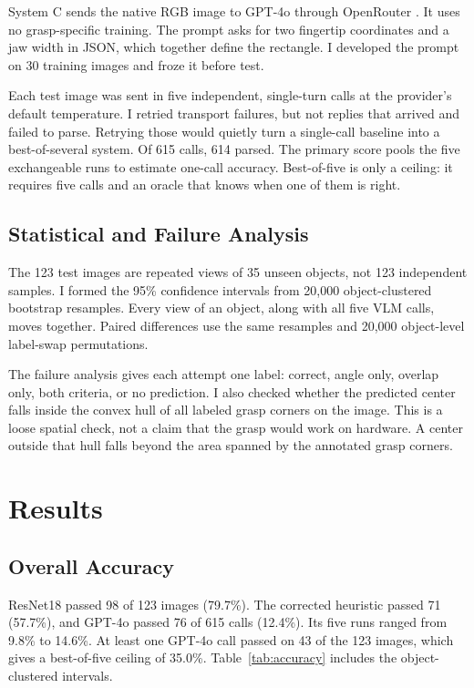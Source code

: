 \documentclass[10pt,conference,compsoc]{IEEEtran}
\begin{document}
System C sends the native RGB image to GPT-4o through OpenRouter
\cite{openai2024}. It uses no grasp-specific training. The prompt asks for two
fingertip coordinates and a jaw width in JSON, which together define the
rectangle. I developed the prompt on 30 training images and froze it before
test.

Each test image was sent in five independent, single-turn calls at the
provider's default temperature. I retried transport failures, but not replies
that arrived and failed to parse. Retrying those would quietly turn a
single-call baseline into a best-of-several system. Of 615 calls, 614 parsed.
The primary score pools the five exchangeable runs to estimate one-call
accuracy. Best-of-five is only a ceiling: it requires five calls and an oracle
that knows when one of them is right.

\subsection{Statistical and Failure Analysis}

The 123 test images are repeated views of 35 unseen objects, not 123
independent samples. I formed the 95\% confidence intervals from 20,000
object-clustered bootstrap resamples. Every view of an object, along with all
five VLM calls, moves together. Paired differences use the same resamples and
20,000 object-level label-swap permutations.

The failure analysis gives each attempt one label: correct, angle only,
overlap only, both criteria, or no prediction. I also checked whether the
predicted center falls inside the convex hull of all labeled grasp corners on
the image. This is a loose spatial check, not a claim that the grasp would
work on hardware. A center outside that hull falls beyond the area spanned by
the annotated grasp corners.

\section{Results}

\subsection{Overall Accuracy}

ResNet18 passed 98 of 123 images (79.7\%). The corrected heuristic passed 71
(57.7\%), and GPT-4o passed 76 of 615 calls (12.4\%). Its five runs ranged
from 9.8\% to 14.6\%. At least one GPT-4o call passed on 43 of the 123 images,
which gives a best-of-five ceiling of 35.0\%. Table~\ref{tab:accuracy} includes
the object-clustered intervals.
\end{document}
